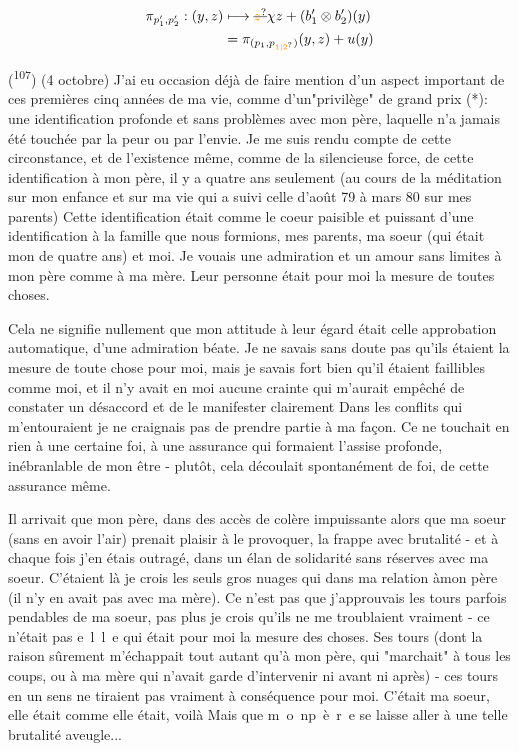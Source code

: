 
\[
\begin{aligned}
\pi_{p'_1,p'_2}:(y,z)&\longmapsto\deleted{\unsure{z}}\chi z+(b'_1\otimes b'_2)(y)\\
 &=\pi_{(p_1,p_{\unsure{1|2}})}(y,z)+u(y)
\end{aligned}
\]



(\textsuperscript{107}) (4 octobre) J'ai eu occasion déjà de faire mention d'un aspect important de ces premières cinq années de ma vie, comme d'un"privilège" de grand prix (*): une identification profonde et sans problèmes avec mon père, laquelle n'a jamais été touchée par la peur ou par l'envie. Je me suis rendu compte de cette circonstance, et de l'existence même, comme de la silencieuse force, de cette identification à mon père, il y a quatre ans seulement (au cours de la méditation sur mon enfance et sur ma vie qui a suivi celle d'août 79 à mars 80 sur mes parents) Cette identification était comme le coeur paisible et puissant d'une identification à la famille que nous formions, mes parents, ma soeur (qui était mon  de quatre ans) et moi. Je vouais une admiration et un amour sans limites à mon père comme à ma mère. Leur personne était pour moi la mesure de toutes choses.

Cela ne signifie nullement que mon attitude à leur égard était celle  approbation automatique, d'une admiration béate. Je ne savais sans doute pas qu'ils étaient la mesure de toute chose pour moi, mais je savais fort bien qu'il étaient faillibles comme moi, et il n'y avait en moi aucune crainte qui m'aurait empêché de constater un désaccord et de le manifester clairement Dans les conflits qui m'entouraient\unsure{;|,} je ne craignais pas de prendre partie à ma façon. Ce ne touchait en rien à une certaine foi, à une assurance qui formaient l'assise profonde, inébranlable de mon être - plutôt, cela découlait spontanément de  foi, de cette assurance même.

Il arrivait que mon père, dans des accès de colère impuissante alors que ma soeur (sans en avoir l'air) prenait plaisir à le provoquer, la frappe avec brutalité - et à chaque fois j'en étais outragé, dans un élan de solidarité sans réserves avec ma soeur. C'étaient là je crois les seuls gros nuages qui  dans ma relation à\unsure{:}mon père (il n'y en avait pas avec ma mère). Ce n'est pas que j'approuvais les tours parfois pendables de ma soeur, pas plus je crois qu'ils ne me troublaient vraiment - ce n'était pas \mbox{e l l e} qui était pour moi la mesure des choses. Ses tours (dont la raison sûrement m'échappait tout autant qu'à mon père, qui "marchait" à tous les coups, ou à ma mère qui n'avait garde d'intervenir ni avant ni après) - ces tours en un sens ne tiraient pas vraiment à conséquence pour moi. C'était ma soeur, elle était comme elle était, voilà  Mais que \mbox{m o n}\quad\mbox{p è r e} se laisse aller à une telle brutalité aveugle...

